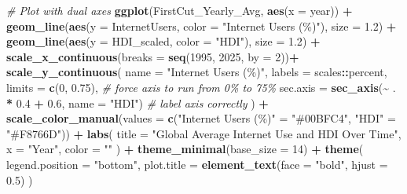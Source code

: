 \documentclass[
]{article}
\newenvironment{Shaded}{\begin{snugshade}}{\end{snugshade}}
\newcommand{\AttributeTok}[1]{\textcolor[rgb]{0.13,0.29,0.53}{#1}}
\newcommand{\CommentTok}[1]{\textcolor[rgb]{0.56,0.35,0.01}{\textit{#1}}}
\newcommand{\DecValTok}[1]{\textcolor[rgb]{0.00,0.00,0.81}{#1}}
\newcommand{\FloatTok}[1]{\textcolor[rgb]{0.00,0.00,0.81}{#1}}
\newcommand{\FunctionTok}[1]{\textcolor[rgb]{0.13,0.29,0.53}{\textbf{#1}}}
\newcommand{\NormalTok}[1]{#1}
\newcommand{\OtherTok}[1]{\textcolor[rgb]{0.56,0.35,0.01}{#1}}
\newcommand{\SpecialCharTok}[1]{\textcolor[rgb]{0.81,0.36,0.00}{\textbf{#1}}}
\newcommand{\StringTok}[1]{\textcolor[rgb]{0.31,0.60,0.02}{#1}}
\begin{document}
\begin{Shaded}
\begin{Highlighting}[]
\CommentTok{\# Plot with dual axes}
\FunctionTok{ggplot}\NormalTok{(FirstCut\_Yearly\_Avg, }\FunctionTok{aes}\NormalTok{(}\AttributeTok{x =}\NormalTok{ year)) }\SpecialCharTok{+}
  \FunctionTok{geom\_line}\NormalTok{(}\FunctionTok{aes}\NormalTok{(}\AttributeTok{y =}\NormalTok{ InternetUsers, }\AttributeTok{color =} \StringTok{"Internet Users (\%)"}\NormalTok{), }\AttributeTok{size =} \FloatTok{1.2}\NormalTok{) }\SpecialCharTok{+}
  \FunctionTok{geom\_line}\NormalTok{(}\FunctionTok{aes}\NormalTok{(}\AttributeTok{y =}\NormalTok{ HDI\_scaled, }\AttributeTok{color =} \StringTok{"HDI"}\NormalTok{), }\AttributeTok{size =} \FloatTok{1.2}\NormalTok{) }\SpecialCharTok{+}
  \FunctionTok{scale\_x\_continuous}\NormalTok{(}\AttributeTok{breaks =} \FunctionTok{seq}\NormalTok{(}\DecValTok{1995}\NormalTok{, }\DecValTok{2025}\NormalTok{, }\AttributeTok{by =} \DecValTok{2}\NormalTok{))}\SpecialCharTok{+}
  \FunctionTok{scale\_y\_continuous}\NormalTok{(}
    \AttributeTok{name =} \StringTok{"Internet Users (\%)"}\NormalTok{,}
    \AttributeTok{labels =}\NormalTok{ scales}\SpecialCharTok{::}\NormalTok{percent,}
    \AttributeTok{limits =} \FunctionTok{c}\NormalTok{(}\DecValTok{0}\NormalTok{, }\FloatTok{0.75}\NormalTok{),  }\CommentTok{\# force axis to run from 0\% to 75\%}
    \AttributeTok{sec.axis =} \FunctionTok{sec\_axis}\NormalTok{(}\SpecialCharTok{\textasciitilde{}}\NormalTok{ . }\SpecialCharTok{*} \FloatTok{0.4} \SpecialCharTok{+} \FloatTok{0.6}\NormalTok{, }\AttributeTok{name =} \StringTok{"HDI"}\NormalTok{) }\CommentTok{\# label axis correctly }
\NormalTok{  ) }\SpecialCharTok{+}
  \FunctionTok{scale\_color\_manual}\NormalTok{(}\AttributeTok{values =} \FunctionTok{c}\NormalTok{(}\StringTok{"Internet Users (\%)"} \OtherTok{=} \StringTok{"\#00BFC4"}\NormalTok{, }\StringTok{"HDI"} \OtherTok{=} \StringTok{"\#F8766D"}\NormalTok{)) }\SpecialCharTok{+}
  \FunctionTok{labs}\NormalTok{(}
    \AttributeTok{title =} \StringTok{"Global Average Internet Use and HDI Over Time"}\NormalTok{,}
    \AttributeTok{x =} \StringTok{"Year"}\NormalTok{,}
    \AttributeTok{color =} \StringTok{""}
\NormalTok{  ) }\SpecialCharTok{+}
  \FunctionTok{theme\_minimal}\NormalTok{(}\AttributeTok{base\_size =} \DecValTok{14}\NormalTok{) }\SpecialCharTok{+}
  \FunctionTok{theme}\NormalTok{(}
    \AttributeTok{legend.position =} \StringTok{"bottom"}\NormalTok{,}
    \AttributeTok{plot.title =} \FunctionTok{element\_text}\NormalTok{(}\AttributeTok{face =} \StringTok{"bold"}\NormalTok{, }\AttributeTok{hjust =} \FloatTok{0.5}\NormalTok{)}
\NormalTok{  )}
\end{Highlighting}
\end{Shaded}
\end{document}
